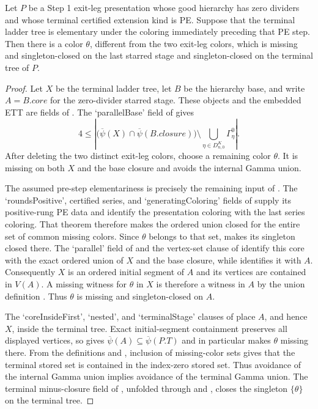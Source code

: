 \begin{lemma}
Let $P$ be a Step 1 exit-leg presentation whose good hierarchy has zero
dividers and whose terminal certified extension kind is PE.  Suppose
that the terminal ladder tree is elementary under the coloring
immediately preceding that PE step.  Then there is a color $\theta$,
different from the two exit-leg colors, which is missing and
singleton-closed on the last starred stage and singleton-closed on the
terminal tree of $P$.
\end{lemma}
\begin{proof}
Let $X$ be the terminal ladder tree, let $B$ be the hierarchy base, and
write $A=B.\mathit{core}$ for the zero-divider starred stage.  These
objects and the embedded ETT are fields of
.  The
`parallelBase' field of  gives
\[
 4\leq\left|\bigl(\overline\psi(X)\cap
 \overline\psi(B.\mathit{closure})\bigr)
 \setminus\bigcup_{\eta\in D^K_{n,0}}\Gamma^0_\eta\right|.
\]
After deleting the two distinct exit-leg colors, choose a remaining
color $\theta$.  It is missing on both $X$ and the base closure and
avoids the internal Gamma union.

The assumed pre-step elementariness is precisely the remaining input of
.  The `roundsPositive', certified
series, and `generatingColoring' fields of
 supply its positive-rung PE data and
identify the presentation coloring with the last series coloring.  That
theorem therefore makes the ordered union closed for the entire set of
common missing colors.  Since $\theta$ belongs to that set,
 makes its singleton closed there.  The
`parallel' field of  and the
vertex-set clause of  identify this core with
the exact ordered union of $X$ and the base closure, while
 identifies it with $A$.  Consequently
$X$ is an ordered initial segment of $A$ and its vertices are contained
in $V(A)$.  A missing witness for $\theta$ in $X$ is therefore a witness
in $A$ by the union definition .  Thus
$\theta$ is missing and singleton-closed on $A$.

The `coreInsideFirst', `nested', and `terminalStage' clauses of
 place $A$, and hence $X$, inside the
terminal tree.  Exact initial-segment containment preserves all displayed
vertices, so  gives
$\overline\psi(A)\subseteq\overline\psi(P.T)$ and in particular makes
$\theta$ missing there.  From the definitions
 and
, inclusion of missing-color sets gives
that the terminal stored set is contained in the index-zero stored set.
Thus avoidance of the internal Gamma union implies avoidance of the
terminal Gamma union.  The terminal minus-closure field of
, unfolded through
 and
, closes the singleton $\{\theta\}$ on the
terminal tree.
\end{proof}
